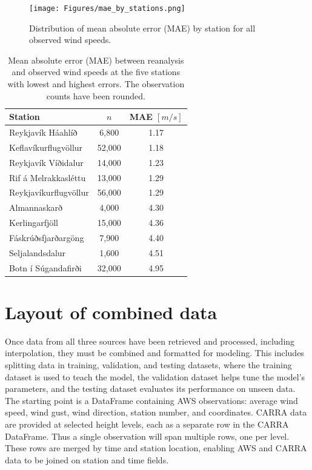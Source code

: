 \begin{figure}[h]
  \centering
  \texttt{[image: Figures/mae\_by\_stations.png]}
  \caption[MAE distribution by station]{Distribution of mean absolute error (MAE) by station for all observed wind speeds.}
  \label{fig:station_mae_distribution}
\end{figure}

\begin{table}[h]
  \centering
  \caption[Station MAE extremes]{Mean absolute error (MAE) between reanalysis and observed wind speeds at the five stations with lowest and highest errors. The observation counts have been rounded.}
  \label{table:station_mae_distribution}
  \begin{tabular}{lcc}
    \toprule
    Station               & $n$     & MAE $[m/s]$ \\
    \midrule
    Reykjavík Háahlíð     & 6,800   & 1.17 \\
    Keflavíkurflugvöllur  & 52,000  & 1.18 \\
    Reykjavík Víðidalur   & 14,000  & 1.23 \\
    Rif á Melrakkasléttu  & 13,000  & 1.29 \\
    Reykjavíkurflugvöllur & 56,000  & 1.29 \\
    \midrule
    Almannaskarð          &  4,000  & 4.30 \\
    Kerlingarfjöll        & 15,000  & 4.36 \\
    Fáskrúðsfjarðargöng   &  7,900  & 4.40 \\
    Seljalandsdalur       &  1,600  & 4.51 \\
    Botn í Súgandafirði   & 32,000  & 4.95 \\
    \bottomrule
  \end{tabular}
\end{table}

\section{Layout of combined data}\label{sec:layout}

Once data from all three sources have been retrieved and processed, including interpolation, they must be combined and formatted for modeling. This includes splitting data in training, validation, and testing datasets, where the training dataset is used to teach the model, the validation dataset helps tune the model's parameters, and the testing dataset evaluates its performance on unseen data. The starting point is a DataFrame containing AWS observations: average wind speed, wind gust, wind direction, station number, and coordinates. CARRA data are provided at selected height levels, each as a separate row in the CARRA DataFrame. Thus a single observation will span multiple rows, one per level. These rows are merged by time and station location, enabling AWS and CARRA data to be joined on station and time fields.

